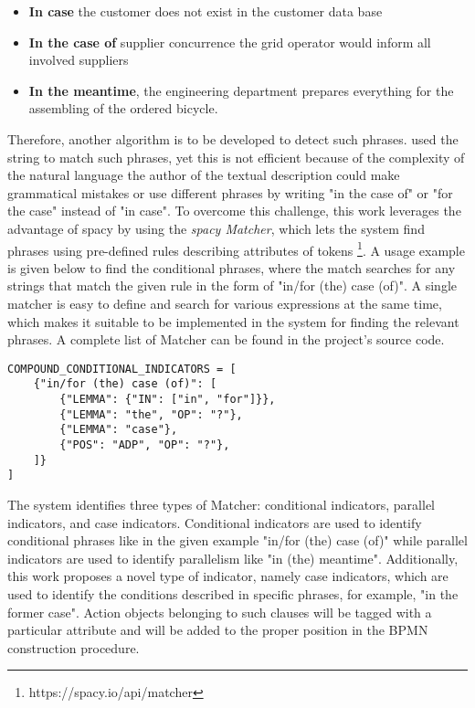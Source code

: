 \begin{itemize}
    \item \textbf{In case} the customer does not exist in the customer data base
    \item \textbf{In the case of} supplier concurrence the grid operator would inform all involved suppliers
    \item \textbf{In the meantime}, the engineering department prepares everything for the assembling of the ordered bicycle.
\end{itemize}

Therefore, another algorithm is to be developed to detect such phrases. \cite{t2m_1_main} used the string to match such phrases, yet this is not efficient because of the complexity of the natural language the author of the textual description could make grammatical mistakes or use different phrases by writing "in the case of" or "for the case" instead of "in case". To overcome this challenge, this work leverages the advantage of spacy by using the \textit{spacy Matcher}, which lets the system find phrases using pre-defined rules describing attributes of tokens \footnote{https://spacy.io/api/matcher}. A usage example is given below to find the conditional phrases, where the match searches for any strings that match the given rule in the form of "in/for (the) case (of)". A single matcher is easy to define and search for various expressions at the same time, which makes it suitable to be implemented in the system for finding the relevant phrases. A complete list of Matcher can be found in the project's source code. 

\begin{lstlisting}
COMPOUND_CONDITIONAL_INDICATORS = [
    {"in/for (the) case (of)": [
        {"LEMMA": {"IN": ["in", "for"]}},
        {"LEMMA": "the", "OP": "?"},
        {"LEMMA": "case"},
        {"POS": "ADP", "OP": "?"},
    ]}
]
\end{lstlisting}

The system identifies three types of Matcher: conditional indicators, parallel indicators, and case indicators. Conditional indicators are used to identify conditional phrases like in the given example "in/for (the) case (of)" while parallel indicators are used to identify parallelism like "in (the) meantime". Additionally, this work proposes a novel type of indicator, namely case indicators, which are used to identify the conditions described in specific phrases, for example, "in the former case". Action objects belonging to such clauses will be tagged with a particular attribute and will be added to the proper position in the BPMN construction procedure.

